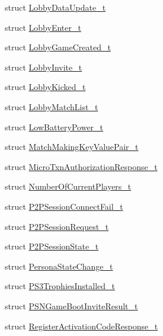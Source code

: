 \begin{DoxyCompactItemize}
\item 
struct \hyperlink{struct_valve_1_1_steamworks_1_1_lobby_data_update__t}{Lobby\+Data\+Update\+\_\+t}
\item 
struct \hyperlink{struct_valve_1_1_steamworks_1_1_lobby_enter__t}{Lobby\+Enter\+\_\+t}
\item 
struct \hyperlink{struct_valve_1_1_steamworks_1_1_lobby_game_created__t}{Lobby\+Game\+Created\+\_\+t}
\item 
struct \hyperlink{struct_valve_1_1_steamworks_1_1_lobby_invite__t}{Lobby\+Invite\+\_\+t}
\item 
struct \hyperlink{struct_valve_1_1_steamworks_1_1_lobby_kicked__t}{Lobby\+Kicked\+\_\+t}
\item 
struct \hyperlink{struct_valve_1_1_steamworks_1_1_lobby_match_list__t}{Lobby\+Match\+List\+\_\+t}
\item 
struct \hyperlink{struct_valve_1_1_steamworks_1_1_low_battery_power__t}{Low\+Battery\+Power\+\_\+t}
\item 
struct \hyperlink{struct_valve_1_1_steamworks_1_1_match_making_key_value_pair__t}{Match\+Making\+Key\+Value\+Pair\+\_\+t}
\item 
struct \hyperlink{struct_valve_1_1_steamworks_1_1_micro_txn_authorization_response__t}{Micro\+Txn\+Authorization\+Response\+\_\+t}
\item 
struct \hyperlink{struct_valve_1_1_steamworks_1_1_number_of_current_players__t}{Number\+Of\+Current\+Players\+\_\+t}
\item 
struct \hyperlink{struct_valve_1_1_steamworks_1_1_p2_p_session_connect_fail__t}{P2\+P\+Session\+Connect\+Fail\+\_\+t}
\item 
struct \hyperlink{struct_valve_1_1_steamworks_1_1_p2_p_session_request__t}{P2\+P\+Session\+Request\+\_\+t}
\item 
struct \hyperlink{struct_valve_1_1_steamworks_1_1_p2_p_session_state__t}{P2\+P\+Session\+State\+\_\+t}
\item 
struct \hyperlink{struct_valve_1_1_steamworks_1_1_persona_state_change__t}{Persona\+State\+Change\+\_\+t}
\item 
struct \hyperlink{struct_valve_1_1_steamworks_1_1_p_s3_trophies_installed__t}{P\+S3\+Trophies\+Installed\+\_\+t}
\item 
struct \hyperlink{struct_valve_1_1_steamworks_1_1_p_s_n_game_boot_invite_result__t}{P\+S\+N\+Game\+Boot\+Invite\+Result\+\_\+t}
\item 
struct \hyperlink{struct_valve_1_1_steamworks_1_1_register_activation_code_response__t}{Register\+Activation\+Code\+Response\+\_\+t}

\end{DoxyCompactItemize}
